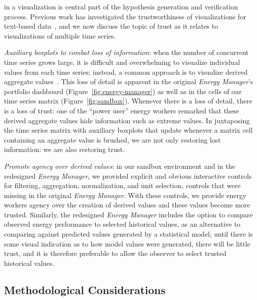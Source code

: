 \documentclass[journal]{vgtc}                %
\newcommand{\bqstart}[1]{\vspace{1mm} \noindent{\textbf{#1}}}
\begin{document}
\bqstart{Trust} in a visualization is central part of the hypothesis generation and verification process. 
Previous work has investigated the trustworthiness of visualizations for text-based data~\cite{Chuang2012}, and we now discuss the topic of trust as it relates to visualizations of multiple time series.

{\it Auxiliary boxplots to combat loss of information}: when the number of concurrent time series grows large, it is difficult and overwhelming to visualize individual values from each time series; instead, a common approach is to visualize derived aggregate values~\cite{McLachlan2008}.
This loss of detail is apparent in the original {\it Energy Manager}'s portfolio dashboard (Figure~\ref{fig:energy-manager}) as well as in the cells of our time series matrix (Figure~\ref{fig:sandbox}).
Whenever there is a loss of detail, there is a loss of trust: one of the ``power user'' energy workers remarked that these derived aggregate values hide information such as extreme values.
In juxtaposing the time series matrix with auxiliary boxplots that update whenever a matrix cell containing an aggregate value is brushed,  we are not only restoring lost information: we are also restoring trust.

{\it Promote agency over derived values}: in our sandbox environment and in the redesigned {\it Energy Manager}, we provided explicit and obvious interactive controls for filtering, aggregation, normalization, and unit selection, controls that were missing in the original {\it Energy Manager}.
With these controls, we provide energy workers agency over the creation of derived values and these values become more trusted.
Similarly, the redesigned {\it Energy Manager} includes the option to compare observed energy performance to selected historical values, as an alternative to comparing against predicted values generated by a statistical model; until there is some visual indication as to how model values were generated, there will be little trust, and it is therefore preferable to allow the observer to select trusted historical values.


\subsection{Methodological Considerations}
\label{discussion-methodology}

\end{document}
